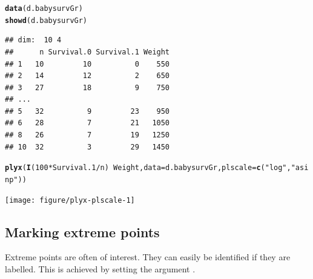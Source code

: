 \documentclass[11pt]{article}\usepackage[]{graphicx}\usepackage[]{color}
\makeatletter
\newcommand{\hlnum}[1]{\textcolor[rgb]{0.686,0.059,0.569}{#1}}%
\newcommand{\hlstr}[1]{\textcolor[rgb]{0.192,0.494,0.8}{#1}}%
\newcommand{\hlopt}[1]{\textcolor[rgb]{0,0,0}{#1}}%
\newcommand{\hlstd}[1]{\textcolor[rgb]{0.345,0.345,0.345}{#1}}%
\newcommand{\hlkwc}[1]{\textcolor[rgb]{0.333,0.667,0.333}{#1}}%
\newcommand{\hlkwd}[1]{\textcolor[rgb]{0.737,0.353,0.396}{\textbf{#1}}}%
\newenvironment{kframe}{%
 \def\at@end@of@kframe{}%
 \ifinner\ifhmode%
  \def\at@end@of@kframe{\end{minipage}}%
  \begin{minipage}{\columnwidth}%
 \fi\fi%
 \def\FrameCommand##1{\hskip\@totalleftmargin \hskip-\fboxsep
 \colorbox{shadecolor}{##1}\hskip-\fboxsep
     \hskip-\linewidth \hskip-\@totalleftmargin \hskip\columnwidth}%
 \MakeFramed {\advance\hsize-\width
   \@totalleftmargin\z@ \linewidth\hsize
   \@setminipage}}%
 {\par\unskip\endMakeFramed%
 \at@end@of@kframe}
\newenvironment{knitrout}{}{} %
\makeatother
\begin{document}
\begin{knitrout}
\color{fgcolor}\begin{kframe}
\begin{alltt}
  \hlkwd{data}\hlstd{(d.babysurvGr)}
  \hlkwd{showd}\hlstd{(d.babysurvGr)}
\end{alltt}
\begin{verbatim}
## dim:  10 4 
##      n Survival.0 Survival.1 Weight
## 1   10         10          0    550
## 2   14         12          2    650
## 3   27         18          9    750
## ...                                
## 5   32          9         23    950
## 6   28          7         21   1050
## 8   26          7         19   1250
## 10  32          3         29   1450
\end{verbatim}
\begin{alltt}
  \hlkwd{plyx}\hlstd{(}\hlkwd{I}\hlstd{(}\hlnum{100}\hlopt{*}\hlstd{Survival.1}\hlopt{/}\hlstd{n)} \hlopt{~} \hlstd{Weight,} \hlkwc{data}\hlstd{=d.babysurvGr,} \hlkwc{plscale}\hlstd{=}\hlkwd{c}\hlstd{(}\hlstr{"log"}\hlstd{,}\hlstr{"asinp"}\hlstd{))}
\end{alltt}
\end{kframe}
\texttt{[image: figure/plyx-plscale-1]} 

\end{knitrout}

\subsection{Marking extreme points}

Extreme points are often of interest. They can easily be identified if they 
are labelled. This is achieved by setting the argument .
\end{document}
